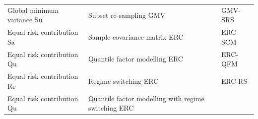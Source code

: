 \documentclass[
]{article}
\begin{document}
\begin{longtable}[]{@{}lll@{}}
\begin{minipage}[t]{0.27\columnwidth}
Global minimum variance \textbar{} Su\strut
\end{minipage} & \begin{minipage}[t]{0.50\columnwidth}\raggedright
Subset re-sampling \textbar{} GMV\strut
\end{minipage} & \begin{minipage}[t]{0.14\columnwidth}\raggedright
GMV-SRS\strut
\end{minipage}\tabularnewline
\begin{minipage}[t]{0.27\columnwidth}\raggedright
Equal risk contribution \textbar{} Sa\strut
\end{minipage} & \begin{minipage}[t]{0.50\columnwidth}\raggedright
Sample covariance matrix \textbar{} ERC\strut
\end{minipage} & \begin{minipage}[t]{0.14\columnwidth}\raggedright
ERC-SCM\strut
\end{minipage}\tabularnewline
\begin{minipage}[t]{0.27\columnwidth}\raggedright
Equal risk contribution \textbar{} Qu\strut
\end{minipage} & \begin{minipage}[t]{0.50\columnwidth}\raggedright
Quantile factor modelling \textbar{} ERC\strut
\end{minipage} & \begin{minipage}[t]{0.14\columnwidth}\raggedright
ERC-QFM\strut
\end{minipage}\tabularnewline
\begin{minipage}[t]{0.27\columnwidth}\raggedright
Equal risk contribution \textbar{} Re\strut
\end{minipage} & \begin{minipage}[t]{0.50\columnwidth}\raggedright
Regime switching \textbar{} ERC\strut
\end{minipage} & \begin{minipage}[t]{0.14\columnwidth}\raggedright
ERC-RS\strut
\end{minipage}\tabularnewline
\begin{minipage}[t]{0.27\columnwidth}\raggedright
Equal risk contribution \textbar{} Qu\strut
\end{minipage} & \begin{minipage}[t]{0.50\columnwidth}\raggedright
Quantile factor modelling with regime switching \textbar{} ERC\strut
\end{minipage} & \begin{minipage}[t]{0.14\columnwidth}\raggedright

\end{minipage}
\end{longtable}
\end{document}
